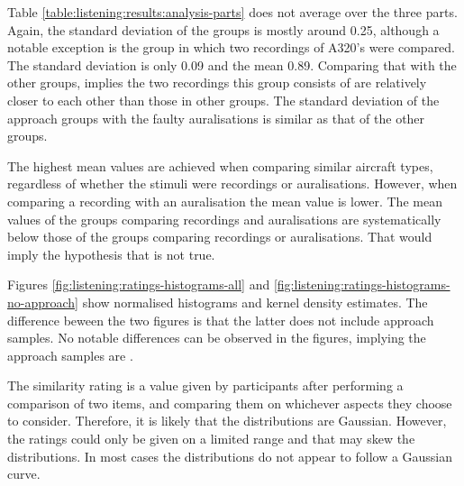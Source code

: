 Table \ref{table:listening:results:analysis-parts} does not average over the
three parts. Again, the standard deviation of the groups is mostly around 0.25,
although a notable exception is the group in which two recordings of A320's were
compared. The standard deviation is only 0.09 and the mean 0.89. Comparing that
with the other groups, implies the two recordings this group consists of are
relatively closer to each other than those in other groups. The standard
deviation of the approach groups with the faulty auralisations is similar as
that of the other groups.

The highest mean values are achieved when comparing similar aircraft types,
regardless of whether the stimuli were recordings or auralisations. However,
when comparing a recording with an auralisation the mean value is lower. The
mean values of the groups comparing recordings and auralisations are
systematically below those of the groups comparing recordings or auralisations.
That would imply the hypothesis that  is not true.

Figures \ref{fig:listening:ratings-histograms-all} and
\ref{fig:listening:ratings-histograms-no-approach} show normalised histograms
and kernel density estimates. The difference beween the two figures is that the
latter does not include approach samples. No notable differences can be observed
in the figures, implying the approach samples are .


The similarity rating is a value given by participants after performing a
comparison of two items, and comparing them on whichever aspects they choose to
consider. Therefore, it is likely that the distributions are Gaussian. However,
the ratings could only be given on a limited range and that may skew the
distributions. In most cases the distributions do not appear to follow a Gaussian curve.



